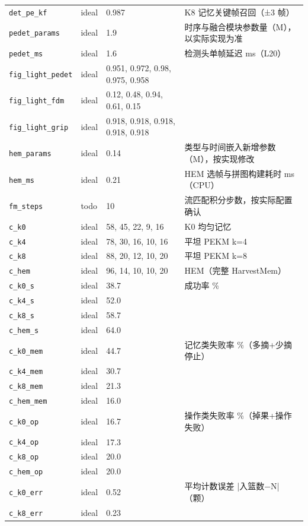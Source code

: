 \begin{longtable}{p{3.2cm}p{0.9cm}p{4.2cm}p{6.2cm}}
\texttt{det\_pe\_kf} & ideal & 0.987 & K8 记忆关键帧召回（±3 帧）\\
\texttt{pedet\_params} & ideal & 1.9 & 时序与融合模块参数量（M），以实际实现为准\\
\texttt{pedet\_ms} & ideal & 1.6 & 检测头单帧延迟 ms（L20）\\
\texttt{fig\_light\_pedet} & ideal & 0.951, 0.972, 0.98, 0.975, 0.958 & \\
\texttt{fig\_light\_fdm} & ideal & 0.12, 0.48, 0.94, 0.61, 0.15 & \\
\texttt{fig\_light\_grip} & ideal & 0.918, 0.918, 0.918, 0.918, 0.918 & \\
\texttt{hem\_params} & ideal & 0.14 & 类型与时间嵌入新增参数（M），按实现修改\\
\texttt{hem\_ms} & ideal & 0.21 & HEM 选帧与拼图构建耗时 ms（CPU）\\
\texttt{fm\_steps} & todo & 10 & 流匹配积分步数，按实际配置确认\\
\texttt{c\_k0} & ideal & 58, 45, 22, 9, 16 & K0 均匀记忆\\
\texttt{c\_k4} & ideal & 78, 30, 16, 10, 16 & 平坦 PEKM k=4\\
\texttt{c\_k8} & ideal & 88, 20, 12, 10, 20 & 平坦 PEKM k=8\\
\texttt{c\_hem} & ideal & 96, 14, 10, 10, 20 & HEM（完整 HarvestMem）\\
\texttt{c\_k0\_s} & ideal & 38.7 & 成功率 \%\\
\texttt{c\_k4\_s} & ideal & 52.0 & \\
\texttt{c\_k8\_s} & ideal & 58.7 & \\
\texttt{c\_hem\_s} & ideal & 64.0 & \\
\texttt{c\_k0\_mem} & ideal & 44.7 & 记忆类失败率 \%（多摘+少摘停止）\\
\texttt{c\_k4\_mem} & ideal & 30.7 & \\
\texttt{c\_k8\_mem} & ideal & 21.3 & \\
\texttt{c\_hem\_mem} & ideal & 16.0 & \\
\texttt{c\_k0\_op} & ideal & 16.7 & 操作类失败率 \%（掉果+操作失败）\\
\texttt{c\_k4\_op} & ideal & 17.3 & \\
\texttt{c\_k8\_op} & ideal & 20.0 & \\
\texttt{c\_hem\_op} & ideal & 20.0 & \\
\texttt{c\_k0\_err} & ideal & 0.52 & 平均计数误差 |入篮数−N|（颗）\\
\texttt{c\_k8\_err} & ideal & 0.23 & \\

\end{longtable}
